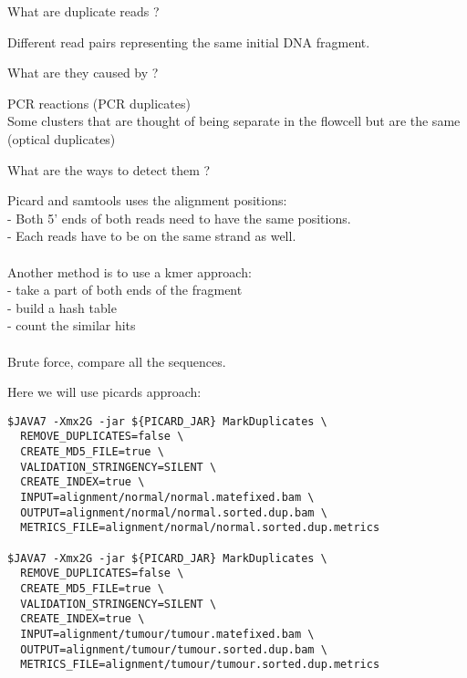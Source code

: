 \begin{questions}
What are duplicate reads ?
\end{questions}
\begin{answer}
Different read pairs representing the same initial DNA fragment.
\end{answer}

\begin{questions} 
What are they caused by ?
\end{questions}
\begin{answer}
PCR reactions (PCR duplicates) \\
Some clusters that are thought of being separate in the flowcell but are the same (optical duplicates)
\end{answer}

\begin{questions} 
What are the ways to detect them ?
\end{questions}
\begin{answer}
Picard and samtools uses the alignment positions: \\
   - Both 5' ends of both reads need to have the same positions. \\ 
   - Each reads have to be on the same strand as well. \\ \\
Another method is to use a kmer approach: \\
   - take a part of both ends of the fragment \\
   - build a hash table  \\
   - count the similar hits \\ \\
Brute force, compare all the sequences.
\end{answer}

Here we will use picards approach:
\begin{lstlisting}
$JAVA7 -Xmx2G -jar ${PICARD_JAR} MarkDuplicates \
  REMOVE_DUPLICATES=false \
  CREATE_MD5_FILE=true \
  VALIDATION_STRINGENCY=SILENT \
  CREATE_INDEX=true \
  INPUT=alignment/normal/normal.matefixed.bam \
  OUTPUT=alignment/normal/normal.sorted.dup.bam \
  METRICS_FILE=alignment/normal/normal.sorted.dup.metrics

$JAVA7 -Xmx2G -jar ${PICARD_JAR} MarkDuplicates \
  REMOVE_DUPLICATES=false \
  CREATE_MD5_FILE=true \
  VALIDATION_STRINGENCY=SILENT \
  CREATE_INDEX=true \
  INPUT=alignment/tumour/tumour.matefixed.bam \
  OUTPUT=alignment/tumour/tumour.sorted.dup.bam \
  METRICS_FILE=alignment/tumour/tumour.sorted.dup.metrics
\end{lstlisting}


